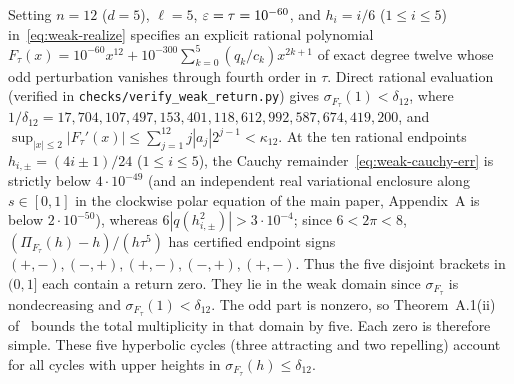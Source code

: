 \begin{remark}[Fully specified rational witness at $n=12$]\label{rem:fixed-weak-witness}
Setting $n=12$ ($d=5$), $\ell=5$, $\varepsilon=\tau=10^{-60}$, and $h_i=i/6$ ($1\le i\le 5$) in~\eqref{eq:weak-realize} specifies an explicit rational polynomial $F_\tau(x)=10^{-60}x^{12}+10^{-300}\sum_{k=0}^5(q_k/c_k)x^{2k+1}$ of exact degree twelve whose odd perturbation vanishes through fourth order in $\tau$. Direct rational evaluation (verified in \texttt{checks/\allowbreak verify\_\allowbreak weak\_\allowbreak return.py}) gives $\sigma_{F_\tau}(1)<\delta_{12}$, where $1/\delta_{12}=\allowbreak 17{,}704{,}107{,}497{,}153{,}401{,}118{,}\allowbreak 612{,}992{,}587{,}674{,}419{,}200$, and $\sup_{|x|\le 2}|F_\tau'(x)|\le\sum_{j=1}^{12}j|a_j|2^{j-1}<\kappa_{12}$. At the ten rational endpoints $h_{i,\pm}=(4i\pm 1)/24$ ($1\le i\le 5$), the Cauchy remainder~\eqref{eq:weak-cauchy-err} is strictly below $4\cdot 10^{-49}$ (and an independent real variational enclosure along $s\in[0,1]$ in the clockwise polar equation of the main paper, Appendix~A is below $2\cdot 10^{-50}$), whereas $6|q(h_{i,\pm}^2)|>3\cdot 10^{-4}$; since $6<2\pi<8$, $(\Pi_{F_\tau}(h)-h)/(h\tau^5)$ has certified endpoint signs $(+,-),(-,+),(+,-),(-,+),(+,-)$. Thus the five disjoint brackets in $(0,1]$ each contain a return zero. They lie in the weak domain since $\sigma_{F_\tau}$ is nondecreasing and $\sigma_{F_\tau}(1)<\delta_{12}$. The odd part is nonzero, so Theorem~A.1(ii) of~\cite{MainArticle} bounds the total multiplicity in that domain by five. Each zero is therefore simple. These five hyperbolic cycles (three attracting and two repelling) account for all cycles with upper heights in $\sigma_{F_\tau}(h)\le\delta_{12}$.

\end{remark}
